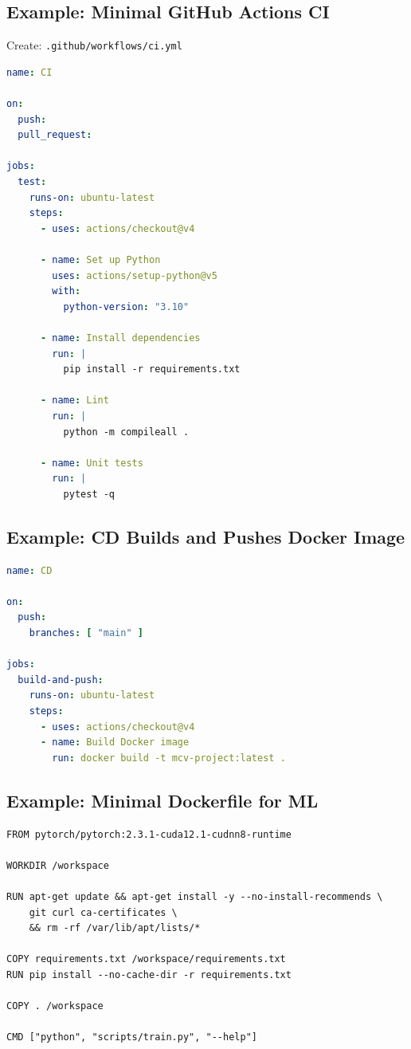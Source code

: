 \documentclass[11pt]{article}
\begin{document}
\subsection{Example: Minimal GitHub Actions CI}
Create: \texttt{.github/workflows/ci.yml}
\begin{lstlisting}[language=yaml]
name: CI

on:
  push:
  pull_request:

jobs:
  test:
    runs-on: ubuntu-latest
    steps:
      - uses: actions/checkout@v4

      - name: Set up Python
        uses: actions/setup-python@v5
        with:
          python-version: "3.10"

      - name: Install dependencies
        run: |
          pip install -r requirements.txt

      - name: Lint
        run: |
          python -m compileall .

      - name: Unit tests
        run: |
          pytest -q
\end{lstlisting}

\subsection{Example: CD Builds and Pushes Docker Image}
\begin{lstlisting}[language=yaml]
name: CD

on:
  push:
    branches: [ "main" ]

jobs:
  build-and-push:
    runs-on: ubuntu-latest
    steps:
      - uses: actions/checkout@v4
      - name: Build Docker image
        run: docker build -t mcv-project:latest .
\end{lstlisting}

\subsection{Example: Minimal Dockerfile for ML}
\begin{lstlisting}[language=Docker]
FROM pytorch/pytorch:2.3.1-cuda12.1-cudnn8-runtime

WORKDIR /workspace

RUN apt-get update && apt-get install -y --no-install-recommends \
    git curl ca-certificates \
    && rm -rf /var/lib/apt/lists/*

COPY requirements.txt /workspace/requirements.txt
RUN pip install --no-cache-dir -r requirements.txt

COPY . /workspace

CMD ["python", "scripts/train.py", "--help"]
\end{lstlisting}
\end{document}
